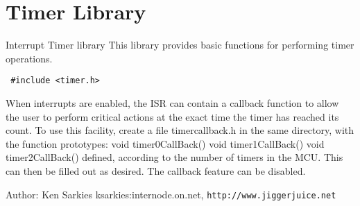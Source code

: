 \section{Timer Library}
\label{group__ksarkies__timer}
Interrupt Timer library This library provides basic functions for performing timer operations.  


\begin{Code}\begin{verbatim} #include <timer.h> 
\end{verbatim}
\end{Code}



When interrupts are enabled, the ISR can contain a callback function to allow the user to perform critical actions at the exact time the timer has reached its count. To use this facility, create a file timercallback.h in the same directory, with the function prototypes: void timer0CallBack() void timer1CallBack() void timer2CallBack() defined, according to the number of timers in the MCU. This can then be filled out as desired. The callback feature can be disabled.

\begin{Desc}
\item[Author:]Ken Sarkies ksarkies:internode.on.net, {\tt http://www.jiggerjuice.net} \end{Desc}

